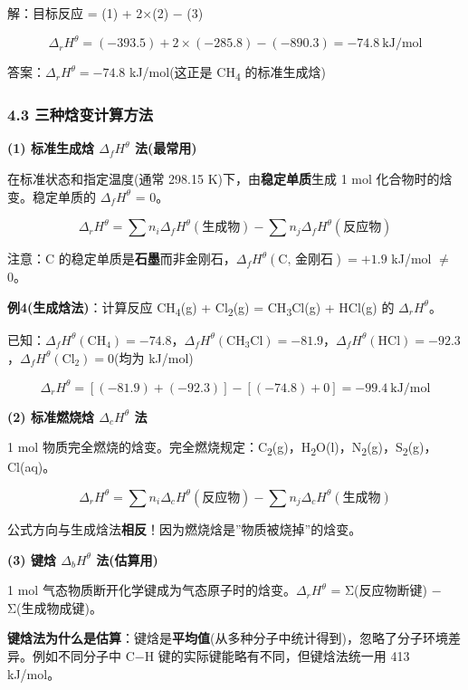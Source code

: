 \documentclass[a4paper,11pt]{ctexart}
\newcommand{\箭}{\ensuremath{\rightarrow}}
\newcommand{\左箭}{\ensuremath{\leftarrow}}
\newcommand{\上箭}{\ensuremath{\uparrow}}
\newcommand{\下箭}{\ensuremath{\downarrow}}
\newcommand{\衡}{\ensuremath{\rightleftharpoons}}
\newcommand{\双箭}{\ensuremath{\leftrightarrow}}
\newcommand{\约等于}{\ensuremath{\approx}}
\newcommand{\小于等于}{\ensuremath{\leq}}
\newcommand{\大于等于}{\ensuremath{\geq}}
\newcommand{\不等于}{\ensuremath{\neq}}
\newcommand{\西格马}{\ensuremath{\sigma}}
\newcommand{\派}{\ensuremath{\pi}}
\begin{document}
解：目标反应 = (1) + 2×(2) − (3)

\[\Delta_r H^\theta = (-393.5) + 2 \times (-285.8) - (-890.3) = -74.8\ \mathrm{kJ/mol}\]

答案：\(\Delta_r H^\theta = -74.8\) kJ/mol(这正是 CH\textsubscript{4} 的标准生成焓)

\subsubsection{4.3 三种焓变计算方法}\label{ux4e09ux79cdux7113ux53d8ux8ba1ux7b97ux65b9ux6cd5}

\textbf{(1) 标准生成焓 \(\Delta_f H^\theta\) 法(最常用)}

在标准状态和指定温度(通常 298.15 K)下，由\textbf{稳定单质}生成 1 mol 化合物时的焓变。稳定单质的 \(\Delta_f H^\theta\) = 0。

\[
\boxed{\Delta_r H^\theta = \sum n_i \Delta_f H^\theta(\text{生成物}) - \sum n_j \Delta_f H^\theta(\text{反应物})}
\]

注意：C 的稳定单质是\textbf{石墨}而非金刚石，\(\Delta_f H^\theta(\text{C, 金刚石}) = +1.9\) kJ/mol \不等于 0。

\textbf{例4(生成焓法)}：计算反应 CH\textsubscript{4}(g) + Cl\textsubscript{2}(g) = CH\textsubscript{3}Cl(g) + HCl(g) 的 \(\Delta_r H^\theta\)。

已知：\(\Delta_f H^\theta(\text{CH}_4) = -74.8\)，\(\Delta_f H^\theta(\text{CH}_3\text{Cl}) = -81.9\)，\(\Delta_f H^\theta(\text{HCl}) = -92.3\)，\(\Delta_f H^\theta(\text{Cl}_2) = 0\)(均为 kJ/mol)

\[\Delta_r H^\theta = [(-81.9) + (-92.3)] - [(-74.8) + 0] = -99.4\ \mathrm{kJ/mol}\]

\textbf{(2) 标准燃烧焓 \(\Delta_c H^\theta\) 法}

1 mol 物质完全燃烧的焓变。完全燃烧规定：C\textsubscript{2}(g)，H\textsubscript{2}O(l)，N\textsubscript{2}(g)，S\textsubscript{2}(g)，Cl(aq)。

\[
\Delta_r H^\theta = \sum n_i \Delta_c H^\theta(\text{反应物}) - \sum n_j \Delta_c H^\theta(\text{生成物})
\]

公式方向与生成焓法\textbf{相反}！因为燃烧焓是''物质被烧掉''的焓变。

\textbf{(3) 键焓 \(\Delta_b H^\theta\) 法(估算用)}

1 mol 气态物质断开化学键成为气态原子时的焓变。\(\Delta_r H^\theta\) = Σ(反应物断键) − Σ(生成物成键)。

\textbf{键焓法为什么是估算}：键焓是\textbf{平均值}(从多种分子中统计得到)，忽略了分子环境差异。例如不同分子中 C−H 键的实际键能略有不同，但键焓法统一用 413 kJ/mol。
\end{document}
